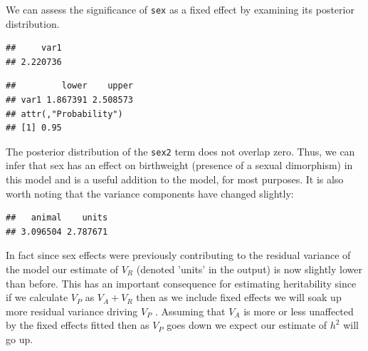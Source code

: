 \documentclass[
  12pt,
]{book}
\newenvironment{Shaded}{\begin{snugshade}}{\end{snugshade}}
\newcommand{\FloatTok}[1]{\textcolor[rgb]{0.00,0.00,0.81}{#1}}
\newcommand{\FunctionTok}[1]{\textcolor[rgb]{0.00,0.00,0.00}{#1}}
\newcommand{\NormalTok}[1]{#1}
\newcommand{\SpecialCharTok}[1]{\textcolor[rgb]{0.00,0.00,0.00}{#1}}
\newcommand{\StringTok}[1]{\textcolor[rgb]{0.31,0.60,0.02}{#1}}
\begin{document}
We can assess the significance of \texttt{sex} as a fixed effect by examining its posterior distribution.

\begin{Shaded}
\end{Shaded}

\begin{verbatim}
##     var1 
## 2.220736
\end{verbatim}

\begin{Shaded}
\end{Shaded}

\begin{verbatim}
##         lower    upper
## var1 1.867391 2.508573
## attr(,"Probability")
## [1] 0.95
\end{verbatim}

The posterior distribution of the \texttt{sex2} term does not overlap zero. Thus, we can infer that sex has an effect on birthweight (presence of a sexual dimorphism) in this model and is a useful addition to the model, for most purposes. It is also worth noting that the variance components have changed slightly:

\begin{Shaded}
\end{Shaded}

\begin{verbatim}
##   animal    units 
## 3.096504 2.787671
\end{verbatim}

In fact since sex effects were previously contributing to the residual variance of the model our estimate of \(V_R\) (denoted 'units' in the output) is now slightly lower than before. This has an important consequence for estimating heritability since if we calculate \(V_P\) as \(V_A +V_R\) then as we include fixed effects we will soak up more residual variance driving \(V_P\) . Assuming that \(V_A\) is more or less unaffected by the fixed effects fitted then as \(V_P\) goes down we expect our estimate of \(h^2\) will go up.
\end{document}
